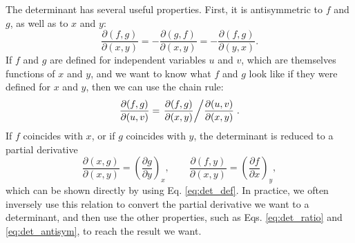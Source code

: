\documentclass[twocolumn, 10pt]{article}
\numberwithin{equation}{section}
\begin{document}
The determinant has several useful properties.
%
First, it is antisymmetric to $f$ and $g$,
as well as to $x$ and $y$:
\begin{equation}
\frac{ \partial (f, g) } {\partial (x, y) }
=
-\frac{ \partial (g, f) } {\partial (x, y) }
=
-\frac{ \partial (f, g) } {\partial (y, x) }.
  \label{eq:det_antisym}
\end{equation}
%
If $f$ and $g$ are defined for independent variables
$u$ and $v$, which are themselves functions of $x$ and $y$,
and we want to know what $f$ and $g$ look like
if they were defined for $x$ and $y$,
then we can use the chain rule:
\begin{equation}
  \frac{ \partial (f, g) } {\partial (u, v) }
  =
  \left.
    \frac{ \partial (f, g) } {\partial (x, y) }
  \middle/
    \frac{ \partial (u, v) } {\partial (x, y) }
  \right.
  .
  \label{eq:det_ratio}
\end{equation}
%
If $f$ coincides with $x$,
or if $g$ coincides with $y$,
the determinant is reduced to a partial derivative
\begin{equation}
  \frac{ \partial (x, g) } {\partial (x, y) }
  =\left( \frac{ \partial g } {\partial y } \right)_{x}
  ,
  \qquad
  \frac{ \partial (f, y) } {\partial (x, y) }
  =\left( \frac{ \partial f } {\partial x } \right)_{y}
  ,
  \label{eq:det_parder}
\end{equation}
which can be shown directly by using Eq. \eqref{eq:det_def}.
%
In practice, we often inversely use this relation
to convert the partial derivative we want
to a determinant, and then use the other properties,
such as Eqs. \eqref{eq:det_ratio} and \eqref{eq:det_antisym},
to reach the result we want.
\end{document}
